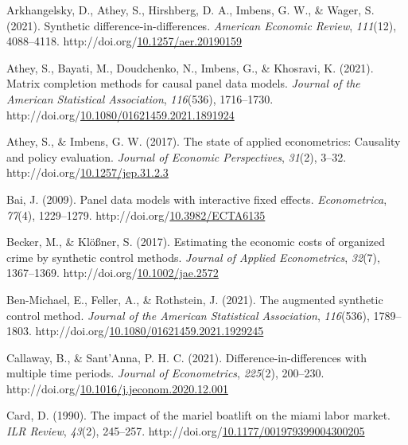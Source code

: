 \documentclass[12pt,nobind, a4paper]{reedthesis}
\newlength{\cslhangindent}
\newenvironment{CSLReferences}[2] %
{%
	\setlength{\parindent}{0pt}
	\ifodd #1 \everypar{\setlength{\hangindent}{\cslhangindent}}\ignorespaces\fi
	\ifnum #2 > 0
	\setlength{\parskip}{#2\baselineskip}
	\fi
}%
{}
\begin{document}
\begin{CSLReferences}{1}{0}
 \leavevmode{}%
 Arkhangelsky, D., Athey, S., Hirshberg, D. A., Imbens, G. W., \& Wager, S. (2021). Synthetic difference-in-differences. \emph{American Economic Review}, \emph{111}(12), 4088--4118. http://doi.org/\href{https://doi.org/10.1257/aer.20190159}{10.1257/aer.20190159}

 \leavevmode{}%
 Athey, S., Bayati, M., Doudchenko, N., Imbens, G., \& Khosravi, K. (2021). Matrix completion methods for causal panel data models. \emph{Journal of the American Statistical Association}, \emph{116}(536), 1716--1730. http://doi.org/\href{https://doi.org/10.1080/01621459.2021.1891924}{10.1080/01621459.2021.1891924}

 \leavevmode{}%
 Athey, S., \& Imbens, G. W. (2017). The state of applied econometrics: Causality and policy evaluation. \emph{Journal of Economic Perspectives}, \emph{31}(2), 3--32. http://doi.org/\href{https://doi.org/10.1257/jep.31.2.3}{10.1257/jep.31.2.3}

 \leavevmode{}%
 Bai, J. (2009). Panel data models with interactive fixed effects. \emph{Econometrica}, \emph{77}(4), 1229--1279. http://doi.org/\href{https://doi.org/10.3982/ECTA6135}{10.3982/ECTA6135}

 \leavevmode{}%
 Becker, M., \& Klößner, S. (2017). Estimating the economic costs of organized crime by synthetic control methods. \emph{Journal of Applied Econometrics}, \emph{32}(7), 1367--1369. http://doi.org/\href{https://doi.org/10.1002/jae.2572}{10.1002/jae.2572}

 \leavevmode{}%
 Ben-Michael, E., Feller, A., \& Rothstein, J. (2021). The augmented synthetic control method. \emph{Journal of the American Statistical Association}, \emph{116}(536), 1789--1803. http://doi.org/\href{https://doi.org/10.1080/01621459.2021.1929245}{10.1080/01621459.2021.1929245}

 \leavevmode{}%
 Callaway, B., \& Sant'Anna, P. H. C. (2021). Difference-in-differences with multiple time periods. \emph{Journal of Econometrics}, \emph{225}(2), 200--230. http://doi.org/\href{https://doi.org/10.1016/j.jeconom.2020.12.001}{10.1016/j.jeconom.2020.12.001}

 \leavevmode{}%
 Card, D. (1990). The impact of the mariel boatlift on the miami labor market. \emph{{ILR} Review}, \emph{43}(2), 245--257. http://doi.org/\href{https://doi.org/10.1177/001979399004300205}{10.1177/001979399004300205}


\end{CSLReferences}
\end{document}
